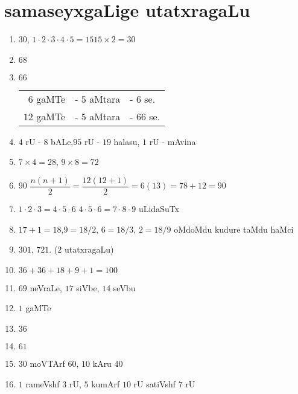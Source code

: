 \chapter{samaseyxgaLige utatxragaLu}

\begin{enumerate}
 \renewcommand{\labelenumi}{\rm(\theenumi)}
\item $30$, \qquad $1 \cdot 2 \cdot 3 \cdot 4 \cdot 5 = 15$\qquad  $15 \times 2 =30$

\item $68$

\item $66$ \qquad \begin{tabular}[t]{rrl}
  $6$ gaMTe&  - $5$ aMtara & - $6$ se.\\
  $12$ gaMTe & - $5$ aMtara & - $66$ se.
\end{tabular}

\item $4$ rU - $8$ bALe,\qquad  $95$ rU - $19$ halasu, \qquad  $1$ rU - mAvina

\item $7 \times 4 = 28$, \qquad $9 \times 8 = 72$

\item $90$ \qquad $\dfrac{n(n+1)}{2} = \dfrac{12(12+1)}{2} = 6(13) = 78 +12 = 90$

\item $1 \cdot 2 \cdot  3 = 4 \cdot  5 \cdot 6$ \qquad $4\cdot 5\cdot 6=7\cdot 8\cdot 9$ uLidaSuTx

\item $17+1 =18$,\quad $9 =18/2$, \quad $6=18/3$, \quad $2 = 18/9$ oMdoMdu kudure taMdu haMci

\item $301$, $721$. ($2$ utatxragaLu)
  
  
\item $36+36+18+9+1 = 100$

\item $69$ neVraLe, $17$ siVbe, $14$ seVbu

\item $1$ gaMTe

\item $36$

\item $61$

\item $30$ moVTArf $60$, $10$ kAru $40$

\item $1$ rameVshf $3$ rU, $5$ kumArf $10$ rU satiVshf $7$ rU


\end{enumerate}
